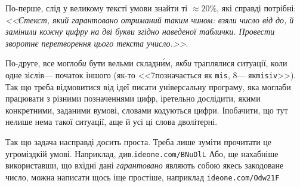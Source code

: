 \Tutorial	По-перше, слід у великому тексті умови знайти ті ${\approx}20\%$, які справді потрібні: \textsl{<<Є\nolinebreak[3] текст, який гарантовано отриманий таким чином: взяли число від до, й замінили кожну цифру на дві букви згідно наведеної таблички. Провести зворотнє перетворення цього текста у\nolinebreak[3] число.>>}.

По-друге, все могло\nolinebreak[3] \emph{би} бути вельми складн\'{и}м, \emph{якби} траплялися ситуації, коли одне зі\nolinebreak[2] слів\nolinebreak[3] --- початок іншого (як-то <<7\nolinebreak[3] позначається як \texttt{mis}, 8\nolinebreak[3] --- як\nolinebreak[2] \texttt{misiv}>>). Так що треба відмовитися від ідеї писати універсальну програму, яка могла\nolinebreak[3] би працювати з різними позначеннями цифр, і\nolinebreak[3] ретельно дослідити, якими конкретними, заданими в\nolinebreak[3] умові, словами кодуються цифри. І\nolinebreak[3] побачити, що тут не\nolinebreak[3] лише нема такої ситуації, а\nolinebreak[3] ще й усі ці слова дволітерні. 

Так що задача насправді досить проста. Треба лише зуміти прочитати це у\nolinebreak[3] громіздкій умові. Наприклад, див.\nolinebreak[2] \verb"ideone.com/BNuDlL"\hspace{0.5em plus 1em} Або, ще нахабніше використавши, що вхідні дані \emph{гарантовано} являють собою якесь закодоване число, можна написати щось іще простіше, наприклад \verb"ideone.com/Odw21F"
